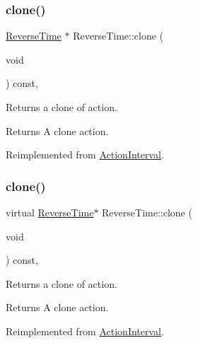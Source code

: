 \subsubsection{\texorpdfstring{clone()}{clone()}\hspace{0.1cm}{\footnotesize\ttfamily [1/2]}}
{\footnotesize\ttfamily \hyperlink{classReverseTime}{Reverse\+Time} $\ast$ Reverse\+Time\+::clone (\begin{DoxyParamCaption}\item[{void}]{ }\end{DoxyParamCaption}) const\hspace{0.3cm}{\ttfamily [override]}, {\ttfamily [virtual]}}

Returns a clone of action.

\begin{DoxyReturn}{Returns}
A clone action. 
\end{DoxyReturn}


Reimplemented from \hyperlink{classActionInterval_abc93ce0c2f54a90eb216a7803f25f44a}{Action\+Interval}.

\mbox{\label{classReverseTime_a371059f58fcb15afad93de0caa385f87}} 
\subsubsection{\texorpdfstring{clone()}{clone()}\hspace{0.1cm}{\footnotesize\ttfamily [2/2]}}
{\footnotesize\ttfamily virtual \hyperlink{classReverseTime}{Reverse\+Time}$\ast$ Reverse\+Time\+::clone (\begin{DoxyParamCaption}\item[{void}]{ }\end{DoxyParamCaption}) const\hspace{0.3cm}{\ttfamily [override]}, {\ttfamily [virtual]}}

Returns a clone of action.

\begin{DoxyReturn}{Returns}
A clone action. 
\end{DoxyReturn}


Reimplemented from \hyperlink{classActionInterval_abc93ce0c2f54a90eb216a7803f25f44a}{Action\+Interval}.

\mbox{\label{classReverseTime_a344d6bce651a1d8ca82314b9763ae8df}} 
